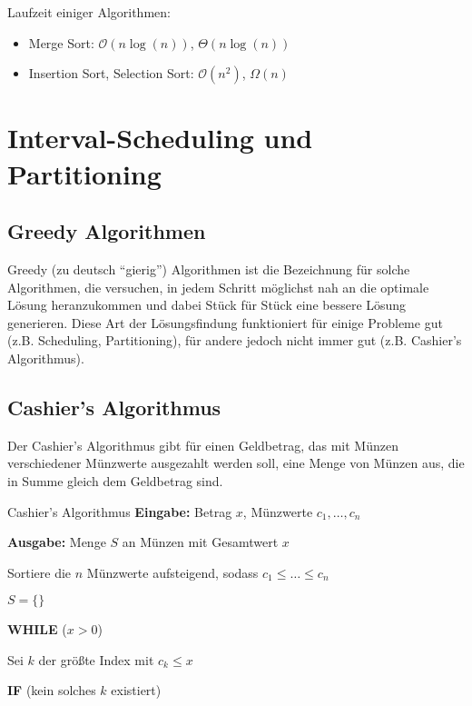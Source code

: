 \documentclass{panikzettel}
\newcommand\tab[1][1cm]{\hspace*{#1}}
\begin{document}
{

Laufzeit einiger Algorithmen:

\begin{itemize}
	\item Merge Sort: $\mathcal{O}(n \log (n))$, $\Theta (n \log (n))$
	\item Insertion Sort, Selection Sort: $\mathcal{O}(n^2)$, $\Omega (n)$
\end{itemize}



\section{Interval-Scheduling und Partitioning}

\subsection{Greedy Algorithmen}

Greedy (zu deutsch ``gierig'') Algorithmen ist die Bezeichnung für solche Algorithmen, die versuchen, in jedem Schritt möglichst nah an die optimale Lösung heranzukommen und dabei Stück für Stück eine bessere Lösung generieren. Diese Art der Lösungsfindung funktioniert für einige Probleme gut (z.B. Scheduling, Partitioning), für andere jedoch nicht immer gut (z.B. Cashier's Algorithmus).

\subsection{Cashier's Algorithmus}

Der Cashier's Algorithmus gibt für einen Geldbetrag, das mit Münzen verschiedener Münzwerte ausgezahlt werden soll, eine Menge von Münzen aus, die in Summe gleich dem Geldbetrag sind. 

\begin{algo}{Cashier's Algorithmus}
	\textbf{Eingabe:} Betrag $x$, Münzwerte $c_1, \dots , c_n$
	
	\textbf{Ausgabe:} Menge $S$ an Münzen mit Gesamtwert $x$
	\tcblower
	
	Sortiere die $n$ Münzwerte aufsteigend, sodass $c_1 \leq \dots \leq c_n$
	
	$S = \{ \}$
	
	\textbf{WHILE} ($x>0$)
	
	\tab Sei $k$ der größte Index mit $c_k \leq x$
	
	\tab \textbf{IF} (kein solches $k$ existiert)
	

\end{algo}}
\end{document}
